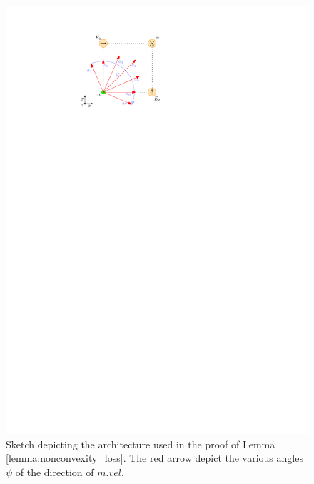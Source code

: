 \begin{figure}[h]
    \centering
    \includegraphics{figures/nonconvexity_of_loss.pdf}
    \caption{Sketch depicting the architecture used in the proof of Lemma \ref{lemma:nonconvexity_loss}. The red arrow depict the various angles $\psi$ of the direction of $m.vel$.}
    \label{fig:nonconvexity_loss}
\end{figure}

